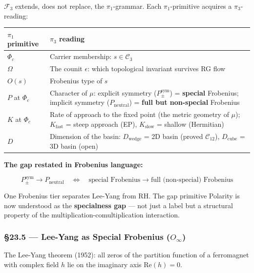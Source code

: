 \documentclass[12pt,a4paper]{article}
\newcommand{\pilcrow}{\S}
\begin{document}
$\mathcal{F}_3$ extends, does not replace, the $\pi_1$-grammar. Each $\pi_1$-primitive acquires a $\pi_3$-reading:

\begin{table}[htbp]
\centering
\small
{}
\begin{tabularx}{\textwidth}{>{\centering\arraybackslash}X >{\centering\arraybackslash}X}
\toprule
\rowcolor{gray!25}\textbf{$\pi_1$ primitive} & \textbf{$\pi_3$ reading} \\
\midrule
\rowcolors{1}{white}{gray!10}
$\Phi_c$ & Carrier membership: $s \in \mathcal{C}_3$ \\
$\Omega$ & The counit $\epsilon$: which topological invariant survives RG flow \\
$O(s)$ & Frobenius type of $s$ \\
$P$ at $\Phi_c$ & Character of $\mu$: explicit symmetry ($P_{\pm}^{\text{sym}}$) = \textbf{special} Frobenius; implicit symmetry ($P_\text{neutral}$) = \textbf{full but non-special} Frobenius \\
$K$ at $\Phi_c$ & Rate of approach to the fixed point (the metric geometry of $\mu$); $K_\text{fast}$ = steep approach (EP), $K_\text{slow}$ = shallow (Hermitian) \\
$D$ & Dimension of the basin: $D_\text{wedge}$ = 2D basin (proved $\mathcal{C}_{12}$), $D_\text{cube}$ = 3D basin (open) \\
\bottomrule
\end{tabularx}
\end{table}

\textbf{The gap restated in Frobenius language:}

\[P_{\pm}^{\text{sym}} \to P_\text{neutral} \quad \Longleftrightarrow \quad \text{special Frobenius} \to \text{full (non-special) Frobenius}\]

One Frobenius tier separates Lee-Yang from RH. The gap primitive Polarity is now understood as the \textbf{specialness gap} --- not just a label but a structural property of the multiplication-comultiplication interaction.

\subsubsection{\pilcrow{}23.5 --- Lee-Yang as Special Frobenius ($O_{\infty}$)}

The Lee-Yang theorem (1952): all zeros of the partition function of a ferromagnet with complex field $h$ lie on the imaginary axis $\text{Re}(h) = 0$.
\end{document}
